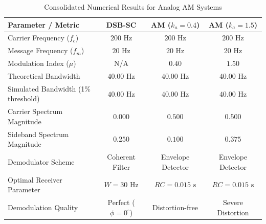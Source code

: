 \documentclass[a4paper]{article}
\begin{document}
\begin{table}[H]
\centering
\caption{Consolidated Numerical Results for Analog AM Systems}
\label{tab:results_summary}
\begin{tabular}{l c c c}
\toprule
\textbf{Parameter / Metric} & \textbf{DSB-SC} & \textbf{AM ($k_a = 0.4$)} & \textbf{AM ($k_a = 1.5$)} \\
\midrule
Carrier Frequency ($f_c$) & $200\text{ Hz}$ & $200\text{ Hz}$ & $200\text{ Hz}$ \\
Message Frequency ($f_m$) & $20\text{ Hz}$ & $20\text{ Hz}$ & $20\text{ Hz}$ \\
Modulation Index ($\mu$) & N/A & $0.40$ & $1.50$ \\
Theoretical Bandwidth & $40.00\text{ Hz}$ & $40.00\text{ Hz}$ & $40.00\text{ Hz}$ \\
Simulated Bandwidth (1\% threshold) & $40.00\text{ Hz}$ & $40.00\text{ Hz}$ & $40.00\text{ Hz}$ \\
Carrier Spectrum Magnitude & $0.000$ & $0.500$ & $0.500$ \\
Sideband Spectrum Magnitude & $0.250$ & $0.100$ & $0.375$ \\
Demodulator Scheme & Coherent Filter & Envelope Detector & Envelope Detector \\
Optimal Receiver Parameter & $W = 30\text{ Hz}$ & $RC = 0.015\text{ s}$ & $RC = 0.015\text{ s}$ \\
Demodulation Quality & Perfect ($\phi = 0^\circ$) & Distortion-free & Severe Distortion \\
\bottomrule
\end{tabular}
\end{table}
\end{document}

